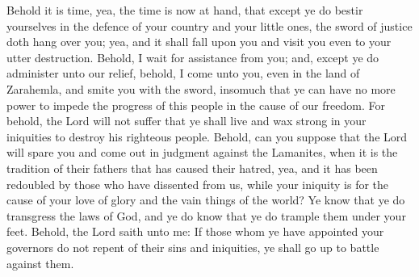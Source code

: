 Behold it is time, yea, the time is now at hand, that except ye do bestir yourselves in the defence of your country and your little ones, the sword of justice doth hang over you; yea, and it shall fall upon you and visit you even to your utter destruction.
\bverse \iffalse Behold, I wait for assistance from you; and, except ye do administer unto our relief, behold, I come unto you, even in the land of Zarahemla, and smite you with the sword, insomuch that ye can have no more power to impede the progress of this people in the cause of our freedom. \fi
Behold, I wait for assistance from you; and, except ye do administer unto our relief, behold, I come unto you, even in the land of Zarahemla, and smite you with the sword, insomuch that ye can have no more power to impede the progress of this people in the cause of our freedom.
\bverse \iffalse For behold, the Lord will not suffer that ye shall live and wax strong in your iniquities to destroy his righteous people. \fi
For behold, the Lord will not suffer that ye shall live and wax strong in your iniquities to destroy his righteous people.
\bverse \iffalse Behold, can you suppose that the Lord will spare you and come out in judgment against the Lamanites, when it is the tradition of their fathers that has caused their hatred, yea, and it has been redoubled by those who have dissented from us, while your iniquity is for the cause of your love of glory and the vain things of the world? \fi
Behold, can you suppose that the Lord will spare you and come out in judgment against the Lamanites, when it is the tradition of their fathers that has caused their hatred, yea, and it has been redoubled by those who have dissented from us, while your iniquity is for the cause of your love of glory and the vain things of the world?
\bverse \iffalse Ye know that ye do transgress the laws of God, and ye do know that ye do trample them under your feet. Behold, the Lord saith unto me: If those whom ye have appointed your governors do not repent of their sins and iniquities, ye shall go up to battle against them. \fi
Ye know that ye do transgress the laws of God, and ye do know that ye do trample them under your feet. Behold, the Lord saith unto me: If those whom ye have appointed your governors do not repent of their sins and iniquities, ye shall go up to battle against them.
\bverse \iffalse And now behold, I, Moroni, am constrained, according to the covenant which I have made to keep the commandments of my God; therefore I would that ye should adhere to the word of God, and send speedily unto me of your provisions and of your men, and also to Helaman. \fi

